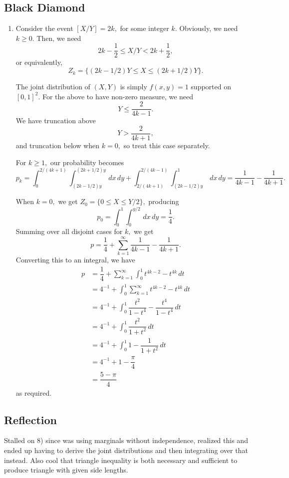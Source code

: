 \documentclass[12pt]{article}
\begin{document}
\subsection{Black Diamond}
\begin{enumerate}
  \item[12] Consider the event $[X /Y] = 2k,$ for some integer $k.$
    Obviously, we need $k \geq 0$. Then, we need
    $$
    2k - \dfrac{1}{2}\leq X/Y < 2k + \dfrac{1}{2},
    $$
    or equivalently,
    $$
    Z_k = \{(2k - 1/2)Y \leq X \leq (2k + 1/2) Y \} .
    $$

    The joint distribution of $(X, Y)$ is simply $f(x,y) = 1$
    supported on $[0, 1]^2.$ For the above to have non-zero measure, we need $$
    Y \leq \dfrac{2}{4k - 1}.
    $$
    We have truncation above $$Y > \dfrac{2}{4k + 1},$$ and
    truncation below when $k = 0,$ so treat this case separately.

    For $k \geq 1,$ our probability becomes
    $$
    p_k = \int_{0}^{2/(4k + 1)} \int_{(2k-1/2)y}^{(2k + 1/2)y} \, dx
    \, dy + \int_{2/(4k+1)}^{2/(4k-1)} \int_{(2k - 1/2)y}^{1} \,dx \,
    dy = \dfrac{1}{4k - 1} - \dfrac{1}{4k + 1}.
    $$

    When $k = 0,$ we get $Z_0 = \{0 \leq X \leq Y/2\},$ producing
    $$
    p_0 = \int_{0}^{1} \int_{0}^{y/2} \, dx \, dy = \dfrac{1}{4}.
    $$
    Summing over all disjoint cases for $k,$ we get
    $$
    p = \dfrac{1}{4} + \sum_{k = 1}^{\infty} \dfrac{1}{4k - 1} -
    \dfrac{1}{4k + 1}.
    $$
    Converting this to an integral, we have
    \begin{align*}
      p &= \dfrac{1}{4}  + \sum_{k = 1}^{\infty} \int_{0}^{1} t^{4k -
      2} - t^{4k} \, dt \\
      &= 4^{-1} + \int_{0}^{1} \sum_{k = 1}^{\infty} t^{4k - 2} -
      t^{4k} \, dt \\
      &= 4^{-1} + \int_{0}^{1} \dfrac{t^2}{1-t^4} - \dfrac{t^4}{1-t^4}\, dt \\
      &= 4^{-1} + \int_{0}^{1} \dfrac{t^2}{1+t^2}\, dt \\
      &= 4^{-1} + \int_{0}^{1} 1- \dfrac{1}{1 + t^2}\, dt \\
      &= 4^{-1} + 1 - \dfrac{\pi}{4} \\
      &= \dfrac{5 - \pi}{4}
    \end{align*}
    as required.
\end{enumerate}
\subsection{Reflection}
Stalled on 8) since was using marginals without independence,
realized this and ended up having to derive the joint distributions
and then integrating over that instead. Also cool that triangle
inequality is both necessary and sufficient to produce triangle with
given side lengths.
\end{document}

